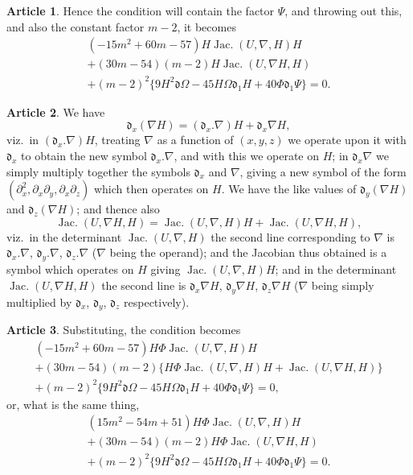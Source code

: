 \documentclass[12pt,a4paper]{article}
\theoremstyle{definition}
\newtheorem{art}{Article}[section]
\DeclareMathOperator{\Jac}{Jac.}
\begin{document}
\begin{art}
Hence the condition will contain the factor $\Psi$, and throwing out this, and also the constant factor $m - 2$, it becomes
\begin{multline*}
(-15m^2 + 60m - 57)H\Jac(U, \nabla, H)H \\
+ (30m - 54)(m - 2)H\Jac(U, \nabla H, H) \\
+ (m - 2)^2\{9H^2\mathfrak{d}\Omega - 45H\Omega\mathfrak{d}_1 H + 40\Phi\mathfrak{d}_1\Psi\} = 0.
\end{multline*}
\end{art}

\begin{art}
We have
\[
\mathfrak{d}_x(\nabla H) = (\mathfrak{d}_x.\nabla)H + \mathfrak{d}_x\nabla H,
\]
viz.\ in $(\mathfrak{d}_x.\nabla)H$, treating $\nabla$ as a function of $(x, y, z)$ we operate upon it with $\mathfrak{d}_x$ to obtain the new symbol $\mathfrak{d}_x.\nabla$, and with this we operate on $H$; in $\mathfrak{d}_x\nabla$ we simply multiply together the symbols $\mathfrak{d}_x$ and $\nabla$, giving a new symbol of the form $(\partial_x^2, \partial_x\partial_y, \partial_x\partial_z)$ which then operates on $H$. We have the like values of $\mathfrak{d}_y(\nabla H)$ and $\mathfrak{d}_z(\nabla H)$; and thence also
\[
\Jac(U, \nabla H, H) = \Jac(U, \nabla, H)H + \Jac(U, \nabla H, H),
\]
viz.\ in the determinant $\Jac(U, \nabla, H)$ the second line corresponding to $\nabla$ is $\mathfrak{d}_x.\nabla$, $\mathfrak{d}_y.\nabla$, $\mathfrak{d}_z.\nabla$ ($\nabla$ being the operand); and the Jacobian thus obtained is a symbol which operates on $H$ giving $\Jac(U, \nabla, H)H$; and in the determinant $\Jac(U, \nabla H, H)$ the second line is $\mathfrak{d}_x\nabla H$, $\mathfrak{d}_y\nabla H$, $\mathfrak{d}_z\nabla H$ ($\nabla$ being simply multiplied by $\mathfrak{d}_x$, $\mathfrak{d}_y$, $\mathfrak{d}_z$ respectively).
\end{art}

\begin{art}
Substituting, the condition becomes
\begin{multline*}
(-15m^2 + 60m - 57)H\Phi\Jac(U, \nabla, H)H \\
+ (30m - 54)(m - 2)\{H\Phi\Jac(U, \nabla, H)H + \Jac(U, \nabla H, H)\} \\
+ (m - 2)^2\{9H^2\mathfrak{d}\Omega - 45H\Omega\mathfrak{d}_1 H + 40\Phi\mathfrak{d}_1\Psi\} = 0,
\end{multline*}
or, what is the same thing,
\begin{multline*}
(15m^2 - 54m + 51)H\Phi\Jac(U, \nabla, H)H \\
+ (30m - 54)(m - 2)H\Phi\Jac(U, \nabla H, H) \\
+ (m - 2)^2\{9H^2\mathfrak{d}\Omega - 45H\Omega\mathfrak{d}_1 H + 40\Phi\mathfrak{d}_1\Psi\} = 0.
\end{multline*}
\end{art}
\end{document}
